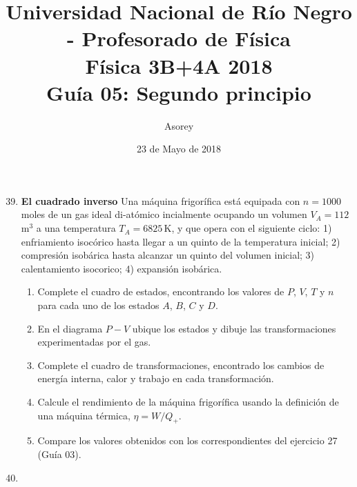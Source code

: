 \documentclass[a4paper,12pt]{article}
\begin{document}
\title{
{\normalsize{Universidad Nacional de Río Negro - Profesorado de Física}}\\
Física 3B+4A  2018 \\ Guía 05: Segundo principio
}
\author{Asorey}
\date{23 de Mayo de 2018} 
\maketitle

\begin{enumerate}
	\setcounter{enumi}{38}      %
    \item {\bf{El cuadrado inverso}}
		Una máquina frigorífica está equipada con $n=1000$\,moles de un gas
		ideal di-atómico incialmente ocupando un volumen $V_A=112$\,m$^3$ a una
		temperatura $T_A=6825$\,K, y que opera con el siguiente ciclo: 1)
		enfriamiento isocórico hasta llegar a un quinto de la temperatura
		inicial; 2) compresión isobárica hasta alcanzar un quinto del volumen
		inicial; 3) calentamiento isocorico; 4) expansión isobárica.
        \begin{enumerate}
            \item Complete el cuadro de estados, encontrando los valores de
                $P$, $V$, $T$ y $n$ para cada uno de los estados $A$, $B$, $C$
                y $D$.
            \item En el diagrama $P-V$ ubique los estados y dibuje las
                transformaciones experimentadas por el gas.
            \item Complete el cuadro de transformaciones, encontrado los
                cambios de energía interna, calor y trabajo en cada
                transformación.
			\item Calcule el rendimiento de la máquina frigorífica usando la
				definición de una máquina térmica, $\eta=W/Q_{+}$.
			\item Compare los valores obtenidos con los correspondientes del
				ejercicio 27 (Guía 03).
        \end{enumerate}

	\item 
\end{enumerate}
\end{document}
